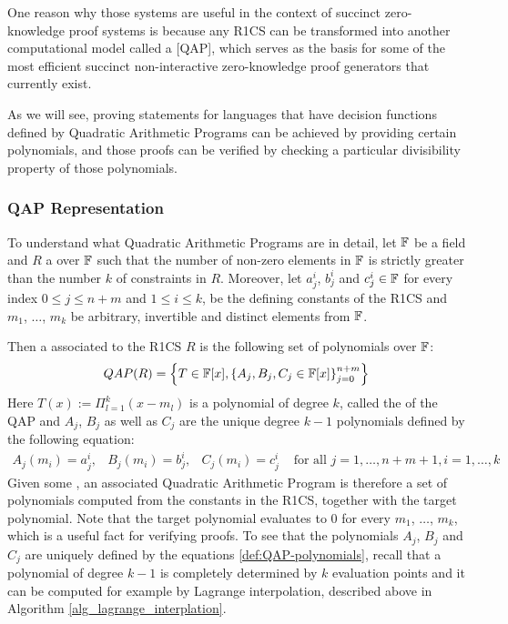 One reason why those systems are useful in the context of succinct zero-knowledge proof systems is because any R1CS can be transformed into another computational model called a  [QAP], which serves as the basis for some of the most efficient succinct non-interactive zero-knowledge proof generators that currently exist. 

As we will see, proving statements for languages that have decision functions defined by Quadratic Arithmetic Programs can be achieved by providing certain polynomials, and those proofs can be verified by checking a particular divisibility property of those polynomials.
 
\subsubsection{QAP Representation} To understand what Quadratic Arithmetic Programs are in detail, let $\mathbb{F}$ be a field and $R$ a  over $\mathbb{F}$ such that the number of non-zero elements in $\mathbb{F}$ is strictly greater than the number $k$ of constraints in $R$. Moreover, let $a_j^i$, $b_j^i$ and $c_j^i\in\mathbb{F}$ for every index $0\leq j \leq n+m$ and $1\leq i \leq k$, be the defining constants of the R1CS and $m_1$, $\ldots$, $m_k$ be arbitrary, invertible and distinct elements from $\mathbb{F}$.
  
Then a  associated to the R1CS $R$ is the following set of polynomials over $\mathbb{F}$:
\begin{equation}
\label{def:QAP-target-poly}
QAP(R) = \left\{T\in \mathbb{F}[x],\left\{A_j,B_j,C_j\in \mathbb{F}[x]\right\}_{j=0}^{n+m}\right\}
\end{equation}
Here $T(x) := \Pi_{l=1}^k (x- m_l)$ is a polynomial of degree $k$, called the  of the QAP and $A_j$, $B_j$ as well as $C_j$ are the unique degree $k-1$ polynomials defined by the following equation:
\begin{equation}
\label{def:QAP-polynomials}
\begin{array}{lllr}
A_j(m_i)=a_j^i, & B_j(m_i)=b_j^i, & C_j(m_i)=c_j^i & \text{ for all } j= 1, \ldots , n+m+1, i=1,\ldots,k 
\end{array}
\end{equation}
Given some , an associated Quadratic Arithmetic Program is therefore a set of polynomials computed from the constants in the R1CS, together with the target polynomial. Note that the target polynomial evaluates to $0$ for every $m_1$, $\ldots$, $m_k$, which is a useful fact for verifying proofs. To see that the polynomials $A_j$, $B_j$ and $C_j$ are uniquely defined by the equations \ref{def:QAP-polynomials}, recall that a polynomial of degree $k-1$ is completely determined by $k$ evaluation points and it can be computed for example by Lagrange interpolation, described above in Algorithm \ref{alg_lagrange_interplation}.

